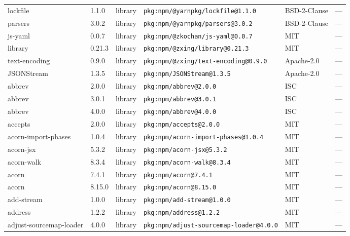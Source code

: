\documentclass[11pt,a4paper]{article}
\begin{document}
\begin{longtable}{|p{4cm}|p{2cm}|p{1.6cm}|p{5cm}|p{1.5cm}|p{3.5cm}|}
\raggedright lockfile & 1.1.0 & library & \small\texttt{pkg:npm/@yarnpkg/lockfile@1.1.0} & BSD-2-Clause & \small — \\
\raggedright parsers & 3.0.2 & library & \small\texttt{pkg:npm/@yarnpkg/parsers@3.0.2} & BSD-2-Clause & \small — \\
\raggedright js-yaml & 0.0.7 & library & \small\texttt{pkg:npm/@zkochan/js-yaml@0.0.7} & MIT & \small — \\
\raggedright library & 0.21.3 & library & \small\texttt{pkg:npm/@zxing/library@0.21.3} & MIT & \small — \\
\raggedright text-encoding & 0.9.0 & library & \small\texttt{pkg:npm/@zxing/text-encoding@0.9.0} & Apache-2.0 & \small — \\
\raggedright JSONStream & 1.3.5 & library & \small\texttt{pkg:npm/JSONStream@1.3.5} & Apache-2.0 & \small — \\
\raggedright abbrev & 2.0.0 & library & \small\texttt{pkg:npm/abbrev@2.0.0} & ISC & \small — \\
\raggedright abbrev & 3.0.1 & library & \small\texttt{pkg:npm/abbrev@3.0.1} & ISC & \small — \\
\raggedright abbrev & 4.0.0 & library & \small\texttt{pkg:npm/abbrev@4.0.0} & ISC & \small — \\
\raggedright accepts & 2.0.0 & library & \small\texttt{pkg:npm/accepts@2.0.0} & MIT & \small — \\
\raggedright acorn-import-phases & 1.0.4 & library & \small\texttt{pkg:npm/acorn-import-phases@1.0.4} & MIT & \small — \\
\raggedright acorn-jsx & 5.3.2 & library & \small\texttt{pkg:npm/acorn-jsx@5.3.2} & MIT & \small — \\
\raggedright acorn-walk & 8.3.4 & library & \small\texttt{pkg:npm/acorn-walk@8.3.4} & MIT & \small — \\
\raggedright acorn & 7.4.1 & library & \small\texttt{pkg:npm/acorn@7.4.1} & MIT & \small — \\
\raggedright acorn & 8.15.0 & library & \small\texttt{pkg:npm/acorn@8.15.0} & MIT & \small — \\
\raggedright add-stream & 1.0.0 & library & \small\texttt{pkg:npm/add-stream@1.0.0} & MIT & \small — \\
\raggedright address & 1.2.2 & library & \small\texttt{pkg:npm/address@1.2.2} & MIT & \small — \\
\raggedright adjust-sourcemap-loader & 4.0.0 & library & \small\texttt{pkg:npm/adjust-sourcemap-loader@4.0.0} & MIT & \small — \\

\end{longtable}
\end{document}

